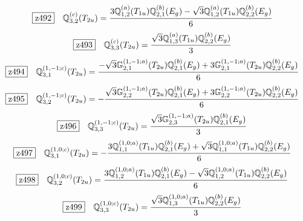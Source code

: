 \documentclass[fleqn,10pt,landscape]{jsarticle}
\begin{document}
\begin{dmath*}
\hspace*{3mm}\fbox{z492}\quad \mathbb{Q}_{3,2}^{(c)}(T_{2u})=\frac{3 \mathbb{Q}_{1,2}^{(a)}(T_{1u}) \mathbb{Q}_{2,1}^{(b)}(E_{g}) - \sqrt{3} \mathbb{Q}_{1,2}^{(a)}(T_{1u}) \mathbb{Q}_{2,2}^{(b)}(E_{g})}{6}
\end{dmath*}
\begin{dmath*}
\hspace*{3mm}\fbox{z493}\quad \mathbb{Q}_{3,3}^{(c)}(T_{2u})=\frac{\sqrt{3} \mathbb{Q}_{1,3}^{(a)}(T_{1u}) \mathbb{Q}_{2,2}^{(b)}(E_{g})}{3}
\end{dmath*}
\begin{dmath*}
\hspace*{3mm}\fbox{z494}\quad \mathbb{Q}_{3,1}^{(1,-1;c)}(T_{2u})=\frac{- \sqrt{3} \mathbb{G}_{2,1}^{(1,-1;a)}(T_{2u}) \mathbb{Q}_{2,1}^{(b)}(E_{g}) + 3 \mathbb{G}_{2,1}^{(1,-1;a)}(T_{2u}) \mathbb{Q}_{2,2}^{(b)}(E_{g})}{6}
\end{dmath*}
\begin{dmath*}
\hspace*{3mm}\fbox{z495}\quad \mathbb{Q}_{3,2}^{(1,-1;c)}(T_{2u})=- \frac{\sqrt{3} \mathbb{G}_{2,2}^{(1,-1;a)}(T_{2u}) \mathbb{Q}_{2,1}^{(b)}(E_{g}) + 3 \mathbb{G}_{2,2}^{(1,-1;a)}(T_{2u}) \mathbb{Q}_{2,2}^{(b)}(E_{g})}{6}
\end{dmath*}
\begin{dmath*}
\hspace*{3mm}\fbox{z496}\quad \mathbb{Q}_{3,3}^{(1,-1;c)}(T_{2u})=\frac{\sqrt{3} \mathbb{G}_{2,3}^{(1,-1;a)}(T_{2u}) \mathbb{Q}_{2,1}^{(b)}(E_{g})}{3}
\end{dmath*}
\begin{dmath*}
\hspace*{3mm}\fbox{z497}\quad \mathbb{Q}_{3,1}^{(1,0;c)}(T_{2u})=- \frac{3 \mathbb{Q}_{1,1}^{(1,0;a)}(T_{1u}) \mathbb{Q}_{2,1}^{(b)}(E_{g}) + \sqrt{3} \mathbb{Q}_{1,1}^{(1,0;a)}(T_{1u}) \mathbb{Q}_{2,2}^{(b)}(E_{g})}{6}
\end{dmath*}
\begin{dmath*}
\hspace*{3mm}\fbox{z498}\quad \mathbb{Q}_{3,2}^{(1,0;c)}(T_{2u})=\frac{3 \mathbb{Q}_{1,2}^{(1,0;a)}(T_{1u}) \mathbb{Q}_{2,1}^{(b)}(E_{g}) - \sqrt{3} \mathbb{Q}_{1,2}^{(1,0;a)}(T_{1u}) \mathbb{Q}_{2,2}^{(b)}(E_{g})}{6}
\end{dmath*}
\begin{dmath*}
\hspace*{3mm}\fbox{z499}\quad \mathbb{Q}_{3,3}^{(1,0;c)}(T_{2u})=\frac{\sqrt{3} \mathbb{Q}_{1,3}^{(1,0;a)}(T_{1u}) \mathbb{Q}_{2,2}^{(b)}(E_{g})}{3}
\end{dmath*}
\end{document}
